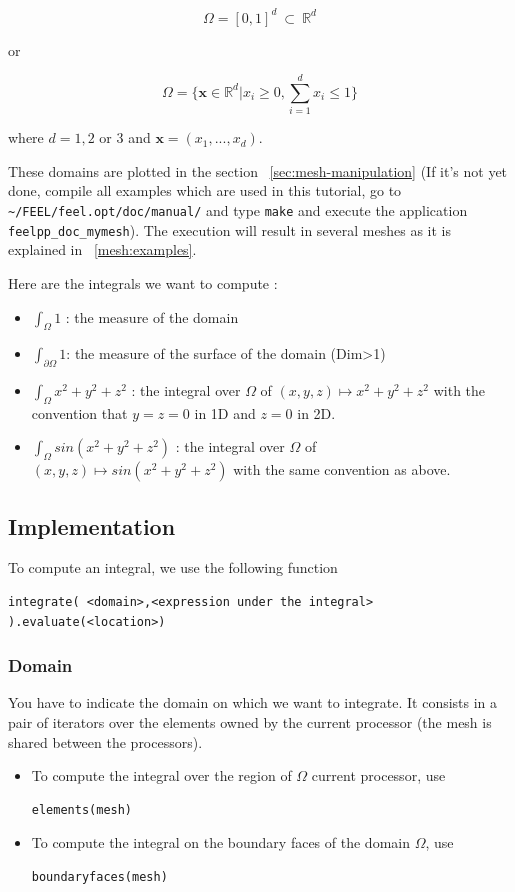 \[ \Omega=[0,1]^d\ \subset\ \mathbb{R}^d \]

or

\[ \Omega=\{ \mathbf{x} \in \mathbb{R}^d | x_i \geq 0, \sum_{i=1}^{d} x_i \leq 1 \} \]

where $ d=1,2$ or $3$ and $\mathbf{x}=(x_1,...,x_d)$.

These domains are plotted in the section ~\ref{sec:mesh-manipulation} (If it's
not yet done, compile all examples which are used in this tutorial, go to
\lstinline!~/FEEL/feel.opt/doc/manual/! and type \verb|make| and execute the
application \verb|feelpp_doc_mymesh|). The execution will result in several meshes
as it is explained in ~\ref{mesh:examples}.

Here are the integrals we want to compute :
\begin{itemize}
\item $\displaystyle{ \int_\Omega 1 }$ : the measure of the domain
\item $\displaystyle{ \int_{\partial\Omega} 1 }$: the measure of the surface of the domain (Dim>1)
\item $ \displaystyle{\int_{\Omega} x^2+y^2+z^2 }$ : the integral over $\displaystyle{\Omega}$ of $ \displaystyle{(x,y,z) \mapsto x^2+y^2+z^2}$ with the convention that $y=z=0$ in 1D and $ z=0 $ in 2D.
\item $\displaystyle{ \int_{\Omega} sin(x^2+y^2+z^2)} $ : the integral over $\Omega$ of $\displaystyle{ (x,y,z) \mapsto sin(x^2+y^2+z^2)}$ with the same convention as above.
\end{itemize}

\subsection{Implementation}

To compute an integral, we use the following function
\begin{lstlisting}
integrate( <domain>,<expression under the integral> ).evaluate(<location>)
\end{lstlisting}

\subsubsection{Domain}

You have to indicate the domain on which we want to integrate. It consists in a pair of iterators over the elements owned by the current processor (the mesh is shared between the processors).
\begin{itemize}
\item To compute the integral over the region of $\Omega$ current processor, use
\begin{lstlisting}
elements(mesh)
\end{lstlisting}
\item To compute the integral on the boundary faces of the domain $\Omega$, use
\begin{lstlisting}
boundaryfaces(mesh)
\end{lstlisting}
\end{itemize}

